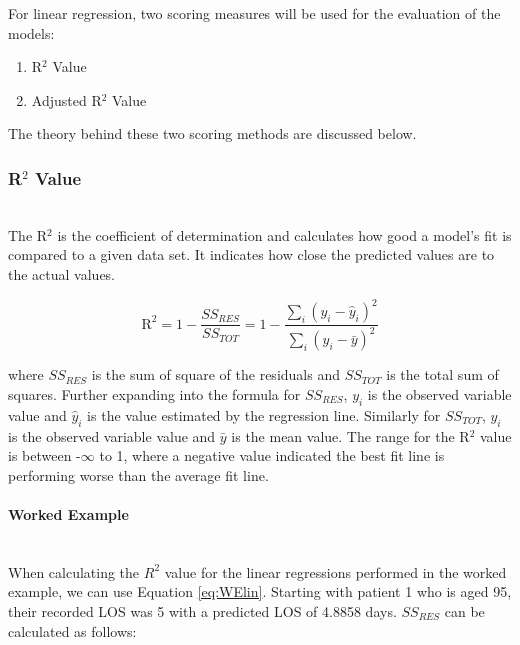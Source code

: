 \documentclass[../thesis.tex]{subfiles}
\begin{document}
For linear regression, two scoring measures will be used for the evaluation of the models:

\begin{enumerate}
    \item R$^{2}$ Value
    \item Adjusted R$^{2}$ Value
\end{enumerate}

The theory behind these two scoring methods are discussed below.

\subsubsection{R$^{2}$ Value}\\
 The R$^{2}$ is the coefficient of determination and calculates how good a model's fit is compared to a given data set. It indicates how close the predicted values are to the actual values.

\begin{equation}\label{eq:r2value}
    \text{R}^{2} =  1 - \frac{SS_{RES}}{SS_{TOT}} = 1 - \frac{\sum_{i}(y_{i} - \hat y_{i})^{2}}{\sum_{i}(y_{i} - \bar y)^{2}}
\end{equation}

where $SS_{RES}$ is the sum of square of the residuals and $SS_{TOT}$ is the total sum of squares. Further expanding into the formula for $SS_{RES}$, $y_{i}$ is the observed variable value and $\hat y_{i}$ is the value estimated by the regression line. Similarly for $SS_{TOT}$, $y_{i}$ is the observed variable value and $\bar y$ is the mean value.
The range for the R$^{2}$ value is between -$\infty$ to 1, where a negative value indicated the best fit line is performing worse than the average fit line.

\paragraph{Worked Example}\\
When calculating the $R^{2}$ value for the linear regressions performed in the worked example, we can use Equation \eqref{eq:WElin}.
Starting with patient 1 who is aged 95, their recorded LOS was 5 with a predicted LOS of 4.8858 days. $SS_{RES}$ can be calculated as follows:
\end{document}
